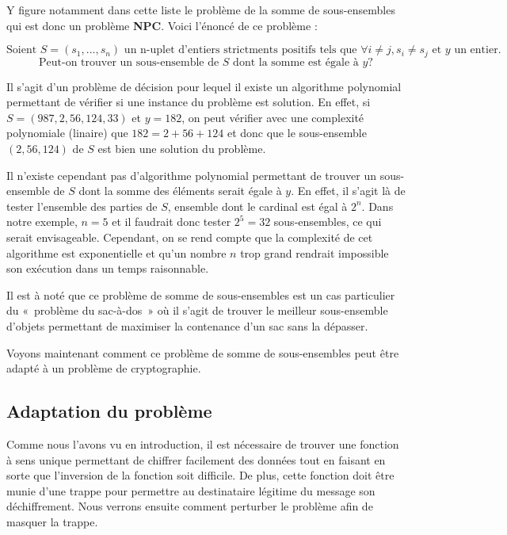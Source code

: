 \documentclass[a4paper,10pt]{article}
\begin{document}
Y figure notamment dans cette liste le problème de la somme de sous-ensembles qui est donc un problème \textbf{NPC}. Voici l'énoncé de ce problème :

$$ \text{Soient }  S = (s_1,...,s_n) \text{ un n-uplet d'entiers strictments positifs tels que } \forall i\neq j, s_i \neq s_j \text{ et } y \text{ un entier.}$$ 
$$\text{Peut-on trouver un sous-ensemble de } S \text{ dont la somme est égale à } y \text{?}$$

Il s'agit d'un problème de décision pour lequel il existe un algorithme polynomial permettant de vérifier si une instance du problème est solution. En effet, si $S = (987, 2, 56, 124, 33)$ et $y = 182$, on peut vérifier avec une complexité polynomiale (linaire) que $182 = 2 + 56 + 124$ et donc que le sous-ensemble $(2, 56, 124)$ de $S$ est bien une solution du problème.

Il n'existe cependant pas d'algorithme polynomial permettant de trouver un sous-ensemble de $S$ dont la somme des éléments serait égale à $y$. En effet, il s'agit là de tester l'ensemble des parties de $S$, ensemble dont le cardinal est égal à $2^n$. Dans notre exemple, $n = 5$ et il faudrait donc tester $2^5 = 32$ sous-ensembles, ce qui serait envisageable. Cependant, on se rend compte que la complexité de cet algorithme est exponentielle et qu'un nombre $n$ trop grand rendrait impossible son exécution dans un temps raisonnable.

Il est à noté que ce problème de somme de sous-ensembles est un cas particulier du «~problème du sac-à-dos~» où il s'agit de trouver le meilleur sous-ensemble d'objets permettant de maximiser la contenance d'un sac sans la dépasser.

Voyons maintenant comment ce problème de somme de sous-ensembles peut être adapté à un problème de cryptographie.

\subsection{Adaptation du problème}

Comme nous l'avons vu en introduction, il est nécessaire de trouver une fonction à sens unique permettant de chiffrer facilement des données tout en faisant en sorte que l'inversion de la fonction soit difficile. De plus, cette fonction doit être munie d'une trappe pour permettre au destinataire légitime du message son déchiffrement. Nous verrons ensuite comment perturber le problème afin de masquer la trappe.
\end{document}
